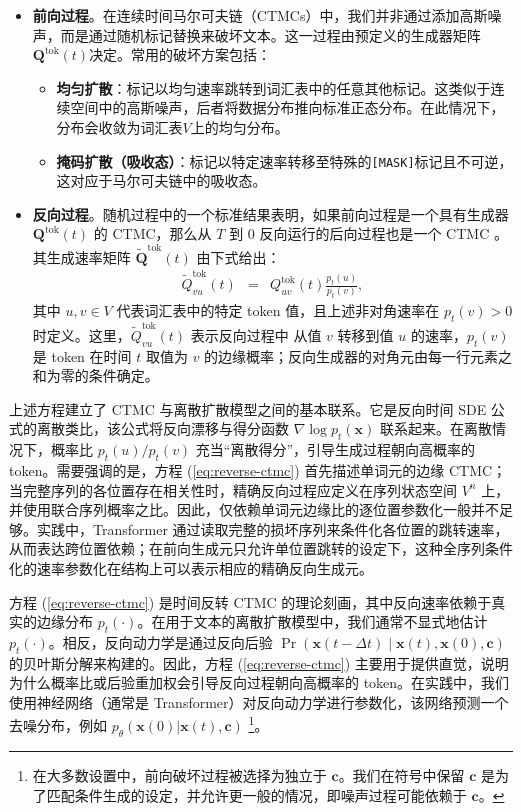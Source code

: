 \documentclass[UTF8,a4paper,zihao=-4,oneside,openany]{ctexbook}
\begin{document}
\begin{itemize}
\item \textbf{前向过程}。在连续时间马尔可夫链（CTMCs）中，我们并非通过添加高斯噪声，而是通过随机标记替换来破坏文本。这一过程由预定义的生成器矩阵$\mathbf{Q}^{\mathrm{tok}}(t)$决定。常用的破坏方案包括：
    \begin{itemize}
    \item \textbf{均匀扩散}：标记以均匀速率跳转到词汇表中的任意其他标记。这类似于连续空间中的高斯噪声，后者将数据分布推向标准正态分布。在此情况下，分布会收敛为词汇表$V$上的均匀分布。
    \item \textbf{掩码扩散（吸收态）}：标记以特定速率转移至特殊的\texttt{[MASK]}标记且不可逆，这对应于马尔可夫链中的吸收态。
    \end{itemize}
\item \textbf{反向过程}。随机过程中的一个标准结果表明，如果前向过程是一个具有生成器 $\mathbf{Q}^{\mathrm{tok}}(t)$ 的 CTMC，那么从 $T$ 到 $0$ 反向运行的后向过程也是一个 CTMC \citep{anderson:1982reverse}。其生成速率矩阵 $\tilde{\mathbf{Q}}^{\mathrm{tok}}(t)$ 由下式给出：
\begin{eqnarray}
\tilde{Q}^{\mathrm{tok}}_{vu}(t) & = & Q^{\mathrm{tok}}_{uv}(t) \frac{p_t(u)}{p_t(v)}, \label{eq:reverse-ctmc}
\end{eqnarray}
\noindent 其中 $u, v \in V$ 代表词汇表中的特定 token 值，且上述非对角速率在
$p_t(v)>0$ 时定义。这里，$\tilde{Q}^{\mathrm{tok}}_{vu}(t)$ 表示反向过程中
从值 $v$ 转移到值 $u$ 的速率，$p_t(v)$ 是 token 在时间 $t$ 取值为 $v$
的边缘概率；反向生成器的对角元由每一行元素之和为零的条件确定。
\end{itemize}

上述方程建立了 CTMC 与离散扩散模型之间的基本联系。它是反向时间 SDE 公式的离散类比，该公式将反向漂移与得分函数 $\nabla \log p_t(\mathbf{x})$ 联系起来。在离散情况下，概率比 $p_t(u)/p_t(v)$ 充当“离散得分”，引导生成过程朝向高概率的 token。需要强调的是，方程 (\ref{eq:reverse-ctmc}) 首先描述单词元的边缘 CTMC；当完整序列的各位置存在相关性时，精确反向过程应定义在序列状态空间 $V^n$ 上，并使用联合序列概率之比。因此，仅依赖单词元边缘比的逐位置参数化一般并不足够。实践中，Transformer 通过读取完整的损坏序列来条件化各位置的跳转速率，从而表达跨位置依赖；在前向生成元只允许单位置跳转的设定下，这种全序列条件化的速率参数化在结构上可以表示相应的精确反向生成元。

方程 (\ref{eq:reverse-ctmc}) 是时间反转 CTMC 的理论刻画，其中反向速率依赖于真实的边缘分布 $p_t(\cdot)$。在用于文本的离散扩散模型中，我们通常不显式地估计 $p_t(\cdot)$。相反，反向动力学是通过反向后验 $\Pr(\mathbf{x}(t-\Delta t)\mid \mathbf{x}(t),\mathbf{x}(0),\mathbf{c})$ 的贝叶斯分解来构建的。因此，方程 (\ref{eq:reverse-ctmc}) 主要用于提供直觉，说明为什么概率比或后验重加权会引导反向过程朝向高概率的 token。在实践中，我们使用神经网络（通常是 Transformer）对反向动力学进行参数化，该网络预测一个去噪分布，例如 $p_\theta(\mathbf{x}(0)| \mathbf{x}(t),\mathbf{c})$ \footnote{在大多数设置中，前向破坏过程被选择为独立于 $\mathbf{c}$。我们在符号中保留 $\mathbf{c}$ 是为了匹配条件生成的设定，并允许更一般的情况，即噪声过程可能依赖于 $\mathbf{c}$。}。
\end{document}
